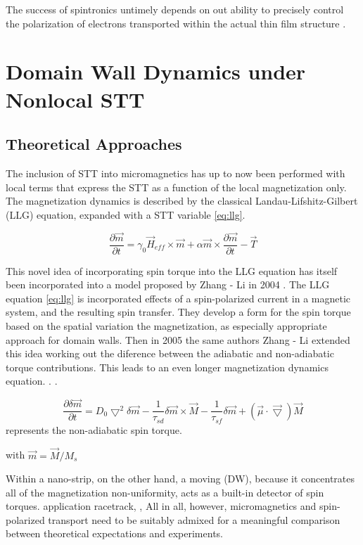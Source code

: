  The success of spintronics untimely depends on out ability to precisely  control the polarization of electrons transported within the actual thin film structure \cite{ferro}.
\section{Domain Wall Dynamics under Nonlocal STT}


\subsection{Theoretical Approaches}

The inclusion of STT into micromagnetics has up to now been performed with local terms that express the STT as a function of the local magnetization only. The magnetization dynamics is described by the classical Landau-Lifshitz-Gilbert (LLG) equation, expanded with a STT variable \ref{eq:llg}.

\begin{equation}  \label{eq:llg}
	\frac{\partial \vec{m}}{\partial t} = \gamma_0\vec{H}_{eff} \times \vec{m} + \alpha \vec{m} \times \frac{\partial \vec{m}}{\partial t} - \vec{T}
\end{equation}

This novel idea of incorporating spin torque into the LLG equation has itself been incorporated into a model proposed by Zhang - Li in 2004 \cite{zhang2004}. The LLG equation \ref{eq:llg} is incorporated effects of a spin-polarized current in a magnetic system, and the resulting spin transfer. They develop a form for the spin torque based on the spatial variation the magnetization, as especially appropriate approach for domain walls. Then in 2005 the same authors Zhang - Li extended this idea  working out the diference between the adiabatic and non-adiabatic torque contributions. This leads to an even longer magnetization dynamics equation. \cite{zhang}. \cite{spindomain}.

\begin{equation} \label{eq:zhang}
 \frac{\partial \delta \vec{m} }{\partial t} =  D_{0}\bigtriangledown^{2} \delta \vec{m} - \frac{1}{\tau_{sd}} \delta \vec{m} \times \vec{M} - \frac{1}{\tau_{sf}}\delta \vec{m} +(\vec{\mu} \cdot\vec{\bigtriangledown} )\vec{M}
\end{equation}
represents the non-adiabatic spin torque.



with $\vec{m} = \vec{M}/M_s$


 Within a nano-strip, on the other hand, a moving (DW), because it concentrates all of the magnetization non-uniformity, acts as a built-in detector of spin torques. application racetrack, ,
  All in all, however, micromagnetics and spin-polarized transport need to be suitably admixed for a meaningful comparison between theoretical expectations and experiments.
 

